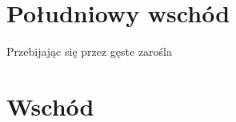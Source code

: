 \documentclass{article}
\begin{document}
    \section{Południowy wschód}

    Przebijając się przez gęste zarośla 

    \section{Wschód}





    
\end{document}
